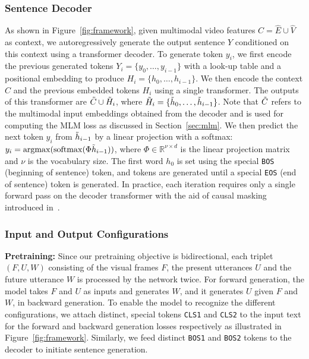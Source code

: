 \documentclass[10pt,twocolumn,letterpaper]{article}
\begin{document}
\subsubsection{Sentence Decoder}
As shown in Figure~\ref{fig:framework}, given multimodal video features $C=\hat{E}\cup \hat{V}$ as context, we autoregressively generate the output sentence $Y$ conditioned on this context using a transformer decoder.
To generate token $y_i$, we first encode the previous generated tokens $Y_i=\{y_{0}, \dots, y_{i-1}\}$ with a look-up table and a positional embedding to produce $H_i=\{h_{0}, \dots, h_{i-1}\}$.
We then encode the context $C$ and the previous embedded tokens $H_i$ using a single transformer. The outputs of this transformer are $\Tilde{C} \cup \Tilde{H}_i$, where $\Tilde{H}_i=\{\Tilde{h}_0,\dots,\Tilde{h}_{i-1}\}$.
Note that $\Tilde{C}$ refers to the multimodal input embeddings obtained from the decoder and is used for computing the MLM loss as discussed in Section~\ref{sec:mlm}.
We then predict the next token $y_i$ from $\Tilde{h}_{i-1}$ by a linear projection with a softmax: $y_i = \mathrm{argmax}(\mathrm{softmax}(\Phi \Tilde{h}_{i-1}))$, where $\Phi \in \mathbb{R}^{\nu\times d}$ is the linear projection matrix and $\nu$ is the vocabulary size.
The first word $h_0$ is set using the special \texttt{BOS} (beginning of sentence) token, and tokens are generated until a special \texttt{EOS} (end of sentence) token is generated.
In practice, each iteration requires only a single forward pass on the decoder transformer with the aid of causal masking introduced in~\cite{vaswani2017attention}. 

\subsubsection{Input and Output Configurations}
\noindent\textbf{Pretraining:} 
Since our pretraining objective is bidirectional, each triplet $(F, U, W)$ consisting of the visual frames $F$, the present utterances $U$ and the future utterance $W$ is processed by the network twice.
For forward generation, the model takes $F$ and $U$ as inputs and generates $W$, and it generates $U$ given $F$ and $W$, in backward generation.
To enable the model to recognize the different configurations, we attach distinct, special tokens \texttt{CLS1} and \texttt{CLS2} to the input text for the forward and backward generation losses respectively as illustrated in Figure~\ref{fig:framework}.
Similarly, we feed distinct \texttt{BOS1} and \texttt{BOS2} tokens to the decoder to initiate sentence generation.
\end{document}
